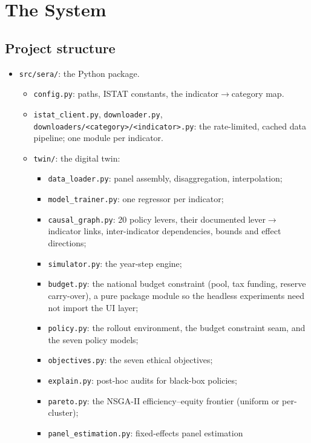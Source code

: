 \documentclass[11pt,a4paper]{article}
\newcommand{\code}[1]{\texttt{#1}}
\begin{document}
\section{The System}
\label{sec:system}

\subsection{Project structure}

\begin{itemize}
    \item \code{src/sera/}: the Python package.
    \begin{itemize}
        \item \code{config.py}: paths, ISTAT constants, the
        indicator$\to$category map.
        \item \code{istat\_client.py}, \code{downloader.py},
        \code{downloaders/<category>/<indicator>.py}: the rate-limited,
        cached data pipeline; one module per indicator.
        \item \code{twin/}: the digital twin:
        \begin{itemize}
            \item \code{data\_loader.py}: panel assembly, disaggregation,
            interpolation;
            \item \code{model\_trainer.py}: one regressor per indicator;
            \item \code{causal\_graph.py}: 20 policy levers, their documented
            lever$\to$indicator links, inter-indicator dependencies, bounds and
            effect directions;
            \item \code{simulator.py}: the year-step engine;
            \item \code{budget.py}: the national budget constraint (pool,
            tax funding, reserve carry-over), a pure package module so the
            headless experiments need not import the UI layer;
            \item \code{policy.py}: the rollout environment, the budget
            constraint seam, and the seven policy models;
            \item \code{objectives.py}: the seven ethical objectives;
            \item \code{explain.py}: post-hoc audits for black-box policies;
            \item \code{pareto.py}: the NSGA-II efficiency--equity frontier
            (uniform or per-cluster);
            \item \code{panel\_estimation.py}: fixed-effects panel estimation

\end{itemize}
\end{itemize}
\end{itemize}
\end{document}
